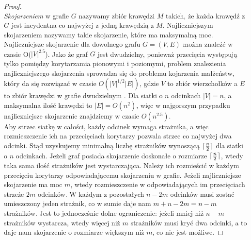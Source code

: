\documentclass[brudnopis]{xmgr}
\DeclarePairedDelimiter\ceil{\lceil}{\rceil}
\theoremstyle{definition}
\begin{document}
\begin{proof}
 \\ \emph{Skojarzeniem} w grafie $G$ nazywamy zbiór krawędzi $M$ takich, że każda krawędź z $G$ jest incydentna co najwyżej z jedną krawędzią z $M$. Najliczniejszym skojarzeniem nazywamy takie skojarzenie, które ma maksymalną moc. Najliczniejsze skojarzenie dla dowolnego grafu $G = (V,E)$ można znaleźć w czasie O($|V|^{2.5}$)\cite{even}. Jako że graf $G$ jest dwudzielny, ponieważ przecięcia występują tylko pomiędzy korytarzamia pionowymi i poziomymi, problem znalezienia najliczniejszego skojarzenia sprowadza się do problemu kojarzenia małżeństw, który da się rozwiązać w czasie $O(|V|^{1/2}|E|)$, gdzie $V$ to zbiór wierzchołków a $E$ to zbiór krawędzi w grafie dwudzielnym \cite{even}. Dla siatki o $n$ odcinkach $|V| = n$, a maksymalna ilość krawędzi to $|E| = O(n^2)$, więc w najgorszym przypadku najliczniejsze skojarzenie znajdziemy w czasie $O(n^{2.5})$.
 \\\indent Aby strzec siatkę w całości, każdy odcinek wymaga strażnika, a więc rozmieszczenie ich na przecięciach korytarzy pozwala strzec co najwyżej dwa odcinki. Stąd uzyskujemy minimalną liczbę strażników wynoszącą $\ceil{\frac{n}{2}}$ dla siatki o $n$ odcinkach. Jeżeli graf posiada skojarzenie doskonałe o rozmiarze $\ceil{\frac{n}{2}}$, wtedy taka sama ilość strażników jest wystarczająca. Należy ich rozmieścić w każdym przecięciu korytarzy odpowiadającemu skojarzeniu w grafie. Jeżeli najliczniejsze skojarzenie ma moc $m$, wtedy rozmieszczenie w odpowiadających im przecięciach strzeże $2m$ odcinków. W każdym z pozostałych $n - 2m$ odcinków musi zostać umieszczony jeden strażnik, co w sumie daje nam $m + n - 2m = n - m$ strażników. Jest to jednocześnie dolne ograniczenie: jeżeli mniej niż $n - m$ strażników wystarcza, wtedy więcej niż $m$ strażników musi kryć dwa odcinki, a to daje nam skojarzenie o rozmiarze większym niż $m$, co nie jest możliwe.
\end{proof}
\end{document}
